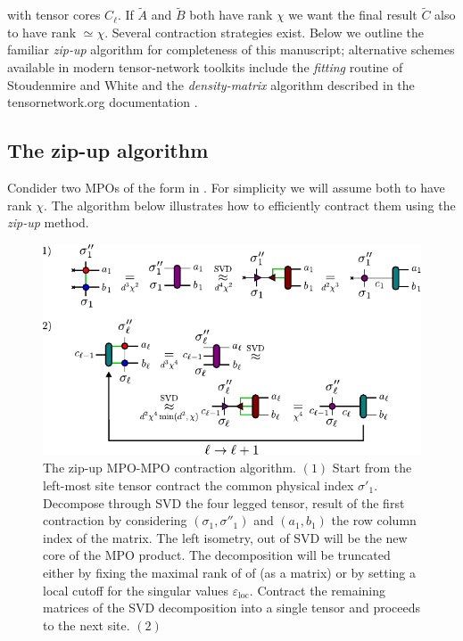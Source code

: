with tensor cores $C_\ell$. If $\widetilde{A}$ and $\widetilde{B}$ both have rank $\chi$ we want the final result $\widetilde{C}$ also to have rank $\simeq \chi$. Several contraction strategies exist. Below we outline the familiar \textit{zip-up} algorithm for completeness of this manuscript; alternative schemes available in modern tensor-network toolkits include the \textit{fitting} routine of Stoudenmire and White \cite{Stoudenmire2010} and the \textit{density-matrix} algorithm described in the tensornetwork.org documentation \cite{tensornetwork.org}.
\subsection{The zip-up algorithm}
Condider two MPOs of the form in . For simplicity we will assume both to have rank $\chi$. The algorithm below illustrates how to efficiently contract them using the \textit{zip-up} method. 
\begin{figure}[ht!]
    \centering
    \includegraphics{figures/ZipUp.pdf}
    \caption{The zip-up MPO-MPO contraction algorithm. $(1)$ Start from the left-most site tensor contract the common physical index $\sigma'_1$. Decompose through SVD the four legged tensor, result of the first contraction by considering $(\sigma_1,\sigma''_1)$ and $(a_1,b_1)$ the row column index of the matrix. The left isometry,  out of SVD will be the new core of the MPO product. The decomposition will be truncated either by fixing the maximal rank of of  (as a matrix) or by setting a local cutoff for the singular values $\varepsilon_{\text{loc}}$. Contract the remaining matrices of the SVD decomposition into a single tensor and proceeds to the next site. $(2)$ }
\end{figure}


